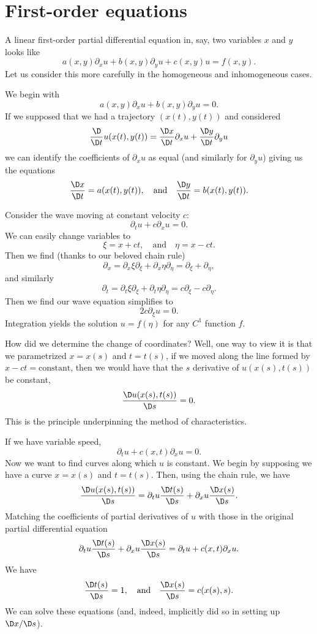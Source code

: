 \section{First-order equations}


\begin{node}\label{pde-0002}%
A linear first-order partial differential equation in, say, two
variables $x$ and $y$ looks like
\[a(x,y)\partial_{x}u+b(x,y)\partial_{y}u+c(x,y)u=f(x,y).\]
Let us consider this more carefully in the homogeneous and inhomogeneous
cases.

\begin{node}[Homogeneous]\label{pde-0003}%
We begin with
\[a(x,y)\partial_{x}u+b(x,y)\partial_{y}u=0.\]
If we supposed that we had a trajectory $(x(t),y(t))$ and considered
\[\frac{\D}{\D t}u(x(t),y(t))=\frac{\D x}{\D t}\partial_{x}u+\frac{\D y}{\D t}\partial_{y}u\]
we can identify the coefficients of $\partial_{x}u$ as equal (and
similarly for $\partial_{y}u$) giving us the equations
\[\frac{\D x}{\D t}=a(x(t),y(t)),\quad\mbox{and}\quad\frac{\D y}{\D t}=b(x(t),y(t)).\]

\begin{example}\label{pde-0005}%
Consider the wave moving at constant velocity $c$:
\[\partial_{t}u+c\partial_{x}u=0.\]
We can easily change variables to
\[\xi=x+ct,\quad\mbox{and}\quad\eta=x-ct.\]
Then we find (thanks to our beloved chain rule)
\[\partial_{x}=\partial_{x}\xi\partial_{\xi}+\partial_{x}\eta\partial_{\eta}=\partial_{\xi}+\partial_{\eta},\]
and similarly
\[\partial_{t}=\partial_{t}\xi\partial_{\xi}+\partial_{t}\eta\partial_{\eta}=c\partial_{\xi}-c\partial_{\eta}.\]
Then we find our wave equation simplifies to
\[2c\partial_{\xi}u=0.\]
Integration yields the solution $u=f(\eta)$ for any $C^{1}$ function $f$.

How did we determine the change of coordinates? Well, one way to view it
is that we parametrized $x=x(s)$ and $t=t(s)$, if we moved along the
line formed by $x-ct=\mbox{constant}$, then we would have that the
$s$ derivative of $u(x(s),t(s))$ be constant,
\[\frac{\D u(x(s),t(s))}{\D s}=0.\]
This is the principle underpinning the method of characteristics.
\end{example}

\begin{example}\label{pde-0006}%
If we have variable speed,
\[\partial_{t}u+c(x,t)\partial_{x}u=0.\]
Now we want to find curves along which $u$ is constant. We begin by
supposing we have a curve $x=x(s)$ and $t=t(s)$. Then, using the chain
rule, we have
\[\frac{\D u(x(s),t(s))}{\D s}=\partial_{t}u\frac{\D t(s)}{\D s} + \partial_{x}u\frac{\D x(s)}{\D s}.\]
Matching the coefficients of partial derivatives of $u$ with those in
the original partial differential equation
\[\partial_{t}u\frac{\D t(s)}{\D s} + \partial_{x}u\frac{\D x(s)}{\D s} =\partial_{t}u+c(x,t)\partial_{x}u.\]
We have
\[\frac{\D t(s)}{\D s}=1,\quad\mbox{and}\quad\frac{\D x(s)}{\D s}=c(x(s),s).\]
We can solve these equations (and, indeed, implicitly did so in setting
up $\D x/\D s$).
\end{example}


\end{node}
\end{node}
